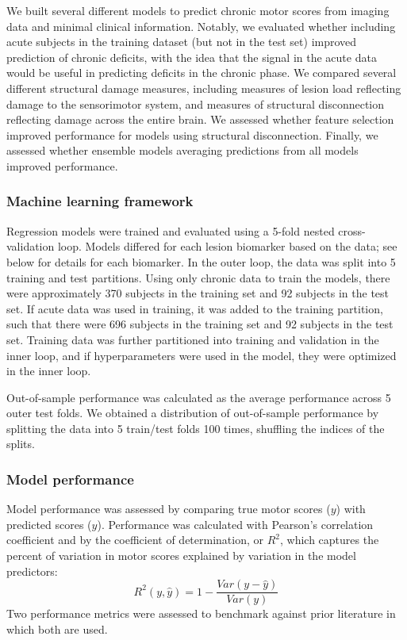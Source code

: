 \documentclass[10pt]{article}
\begin{document}
We built several different models to predict chronic motor scores from imaging data and minimal clinical information. Notably, we evaluated whether including acute subjects in the training dataset (but not in the test set) improved prediction of chronic deficits, with the idea that the signal in the acute data would be useful in predicting deficits in the chronic phase. We compared several different structural damage measures, including measures of lesion load reflecting damage to the sensorimotor system, and measures of structural disconnection reflecting damage across the entire brain. We assessed whether feature selection improved performance for models using structural disconnection. Finally, we assessed whether ensemble models averaging predictions from all models improved performance. 

\subsubsection*{Machine learning framework}
Regression models were trained and evaluated using a 5-fold nested cross-validation loop. Models differed for each lesion biomarker based on the data; see below for details for each biomarker. In the outer loop, the data was split into 5 training and test partitions. Using only chronic data to train the models, there were approximately 370 subjects in the training set and 92 subjects in the test set. If acute data was used in training, it was added to the training partition, such that there were 696 subjects in the training set and 92 subjects in the test set. Training data was further partitioned into training and validation in the inner loop, and if hyperparameters were used in the model, they were optimized in the inner loop. 

Out-of-sample performance was calculated as the average performance across 5 outer test folds. We obtained a distribution of out-of-sample performance by splitting the data into 5 train/test folds 100 times, shuffling the indices of the splits. 

\subsubsection*{Model performance}
Model performance was assessed by comparing true motor scores ($y$) with predicted scores ($\hat{y}$). Performance was calculated with Pearson's correlation coefficient and by the coefficient of determination, or $R^2$, which captures the percent of variation in motor scores explained by variation in the model predictors:
\begin{equation}
    R^2(y, \hat{y}) = 1 - \frac{Var(y-\hat{y})}{Var(y)}
\end{equation}
Two performance metrics were assessed to benchmark against prior literature in which both are used. 
\end{document}

